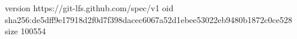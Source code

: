 version https://git-lfs.github.com/spec/v1
oid sha256:de5dff9e17918d2f0d7f398dacec6067a52d1ebee53022eb9480b1872c0ce528
size 100554

